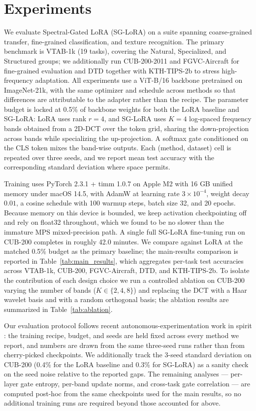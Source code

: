 \documentclass{article}
\begin{document}
\section{Experiments}
We evaluate Spectral-Gated LoRA (SG-LoRA) on a suite spanning coarse-grained transfer, fine-grained classification, and texture recognition. The primary benchmark is VTAB-1k (19 tasks), covering the Natural, Specialized, and Structured groups; we additionally run CUB-200-2011 and FGVC-Aircraft for fine-grained evaluation and DTD together with KTH-TIPS-2b to stress high-frequency adaptation. All experiments use a ViT-B/16 backbone pretrained on ImageNet-21k, with the same optimizer and schedule across methods so that differences are attributable to the adapter rather than the recipe. The parameter budget is locked at 0.5\% of backbone weights for both the LoRA baseline and SG-LoRA: LoRA uses rank $r=4$, and SG-LoRA uses $K=4$ log-spaced frequency bands obtained from a 2D-DCT over the token grid, sharing the down-projection across bands while specializing the up-projection. A softmax gate conditioned on the CLS token mixes the band-wise outputs. Each (method, dataset) cell is repeated over three seeds, and we report mean test accuracy with the corresponding standard deviation where space permits.

Training uses PyTorch 2.3.1 + timm 1.0.7 on Apple M2 with 16 GB unified memory under macOS 14.5, with AdamW at learning rate $3\times 10^{-4}$, weight decay $0.01$, a cosine schedule with 100 warmup steps, batch size 32, and 20 epochs. Because memory on this device is bounded, we keep activation checkpointing off and rely on float32 throughout, which we found to be no slower than the immature MPS mixed-precision path. A single full SG-LoRA fine-tuning run on CUB-200 completes in roughly 42.0 minutes. We compare against LoRA at the matched 0.5\% budget as the primary baseline; the main-results comparison is reported in Table~\ref{tab:main_results}, which aggregates per-task test accuracies across VTAB-1k, CUB-200, FGVC-Aircraft, DTD, and KTH-TIPS-2b. To isolate the contribution of each design choice we run a controlled ablation on CUB-200 varying the number of bands ($K \in \{2, 4, 8\}$) and replacing the DCT with a Haar wavelet basis and with a random orthogonal basis; the ablation results are summarized in Table~\ref{tab:ablation}.

Our evaluation protocol follows recent autonomous-experimentation work in spirit \citep{lu2024aiscientist, yamada2025aiscientistv2}: the training recipe, budget, and seeds are held fixed across every method we report, and numbers are drawn from the same three-seed runs rather than from cherry-picked checkpoints. We additionally track the 3-seed standard deviation on CUB-200 (0.4\% for the LoRA baseline and 0.3\% for SG-LoRA) as a sanity check on the seed noise relative to the reported gaps. The remaining analyses — per-layer gate entropy, per-band update norms, and cross-task gate correlation — are computed post-hoc from the same checkpoints used for the main results, so no additional training runs are required beyond those accounted for above.
\end{document}

